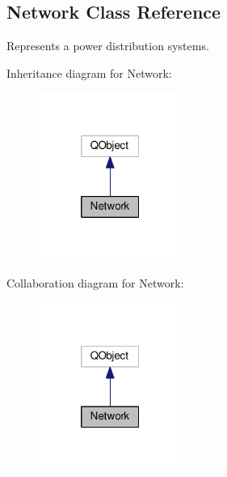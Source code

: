 \hypertarget{class_network}{}\subsection{Network Class Reference}
\label{class_network}


Represents a power distribution systems.  




Inheritance diagram for Network\+:
\nopagebreak
\begin{figure}[H]
\begin{center}
\leavevmode
\includegraphics[width=133pt]{class_network__inherit__graph}
\end{center}
\end{figure}


Collaboration diagram for Network\+:
\nopagebreak
\begin{figure}[H]
\begin{center}
\leavevmode
\includegraphics[width=133pt]{class_network__coll__graph}
\end{center}
\end{figure}
